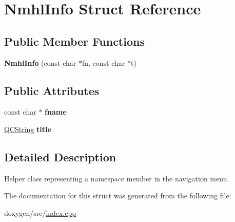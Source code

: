 \hypertarget{struct_nmhl_info}{}\section{Nmhl\+Info Struct Reference}
\label{struct_nmhl_info}
\subsection*{Public Member Functions}
\begin{DoxyCompactItemize}
\item 
\mbox{\label{struct_nmhl_info_a0cc5c99121c24220381089264ad71f04}} 
{\bfseries Nmhl\+Info} (const char $\ast$fn, const char $\ast$t)
\end{DoxyCompactItemize}
\subsection*{Public Attributes}
\begin{DoxyCompactItemize}
\item 
\mbox{\label{struct_nmhl_info_a065740eda2e359636dff74500e473095}} 
const char $\ast$ {\bfseries fname}
\item 
\mbox{\label{struct_nmhl_info_a4be729683c2b5b82be22d86c2c72739d}} 
\mbox{\hyperlink{class_q_c_string}{Q\+C\+String}} {\bfseries title}
\end{DoxyCompactItemize}


\subsection{Detailed Description}
Helper class representing a namespace member in the navigation menu. 

The documentation for this struct was generated from the following file\+:\begin{DoxyCompactItemize}
\item 
doxygen/src/\mbox{\hyperlink{index_8cpp}{index.\+cpp}}\end{DoxyCompactItemize}
